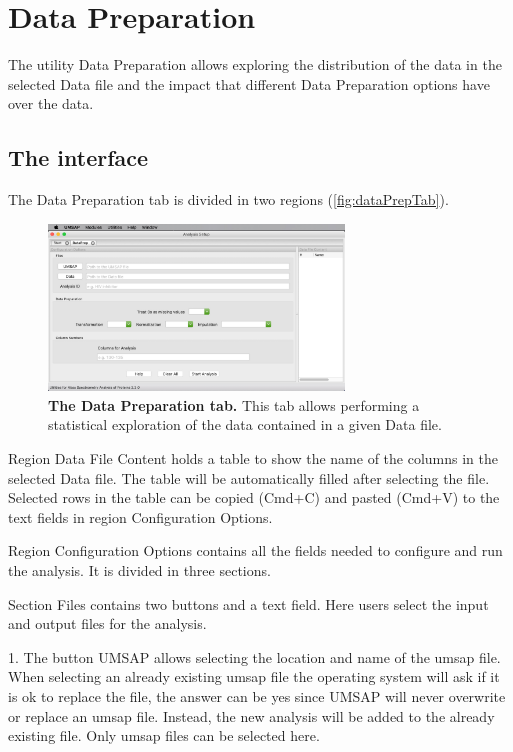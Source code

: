 \chapter{Data Preparation}
\label{chap:dataPrep}

The utility Data Preparation allows exploring the distribution of the data in the
selected Data file and the impact that different Data Preparation options have over
the data.

\section{The interface}

The Data Preparation tab is divided in two regions (\autoref{fig:dataPrepTab}).

\begin{figure}[h]
    \centering
    \includegraphics[width=0.7\textwidth]{./IMAGES/DATAPREP/DataPrep.jpg}
    \caption[The Data Preparation tab]{\textbf{The Data Preparation tab.}
    This tab allows performing a statistical exploration of the data contained in
    a given Data file.}
    \label{fig:dataPrepTab}
    \vspace{-5pt}
\end{figure}

Region Data File Content holds a table to show the name of the columns in
the selected Data file. The table will be automatically filled after selecting the
file. Selected rows in the table can be copied (Cmd+C) and pasted (Cmd+V) to the
text fields in region Configuration Options.

Region Configuration Options contains all the fields needed to configure and
run the analysis. It is divided in three sections.

Section Files contains two buttons and a text field. Here users select the input
and output files for the analysis.

\num{1}. The button UMSAP allows selecting the location
and name of the umsap file. When selecting an already existing umsap file the operating
system will ask if it is ok to replace the file, the answer can be yes since UMSAP
will never overwrite or replace an umsap file. Instead, the new analysis will be
added to the already existing file. Only umsap files can be selected here.

